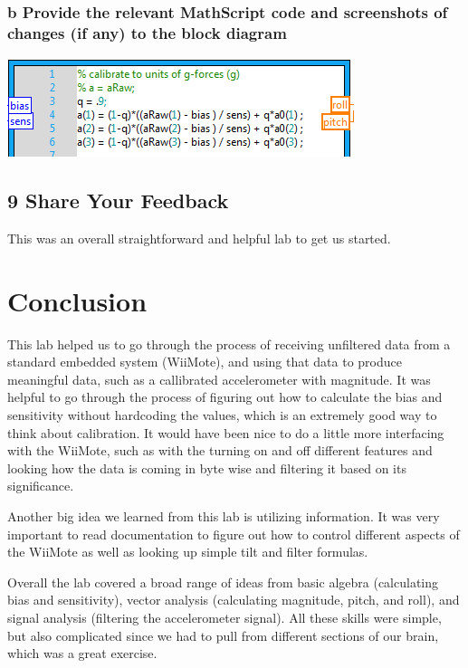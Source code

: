 \documentclass[10pt,a4paper]{article}
\begin{document}
    \subsubsection*{b Provide the relevant MathScript code and screenshots of changes (if any) to the block diagram}
      \includegraphics{../lab1_data/lab1_8a.PNG} 
  \subsection*{9 Share Your Feedback}
    This was an overall straightforward and helpful lab to get us started.
\section*{Conclusion}
  This lab helped us to go through the process of receiving unfiltered data from a standard embedded system (WiiMote), and using that data to produce meaningful data, such as a callibrated accelerometer with magnitude. It was helpful to go through the process of figuring out how to calculate the bias and sensitivity without hardcoding the values, which is an extremely good way to think about calibration. It would have been nice to do a little more interfacing with the WiiMote, such as with the turning on and off different features and looking how the data is coming in byte wise and filtering it based on its significance.

Another big idea we learned from this lab is utilizing information. It was very important to read documentation to figure out how to control different aspects of the WiiMote as well as looking up simple tilt and filter formulas.
  
Overall the lab covered a broad range of ideas from basic algebra (calculating bias and sensitivity), vector analysis (calculating magnitude, pitch, and roll), and signal analysis (filtering the accelerometer signal). All these skills were simple, but also complicated since we had to pull from different sections of our brain, which was a great exercise. 
\end{document}
